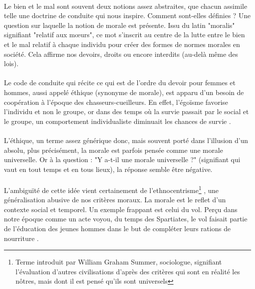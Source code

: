 \documentclass[10pt, french, a4paper]{article}
\begin{document}
\paragraph{}
Le bien et le mal sont souvent deux notions assez abstraites, que chacun assimile telle une doctrine de conduite qui nous inspire. Comment sont-elles définies ? Une question sur laquelle la notion de morale est présente. Issu du latin "moralis" signifiant "relatif aux mœurs", ce mot s’inscrit au centre de la lutte entre le bien et le mal relatif à chaque individu pour créer des formes de normes morales en société. Cela affirme nos devoirs, droits ou encore interdits (au-delà même des lois).

\paragraph{}
Le code de conduite qui récite ce qui est de l’ordre du devoir pour femmes et hommes, aussi appelé éthique (synonyme de morale), est apparu d’un besoin de coopération à l’époque des chasseurs-cueilleurs. En effet, l’égoïsme favorise l’individu et non le groupe, or dans des temps où la survie passait par le social et le groupe, un comportement individualiste diminuait les chances de survie \citep{harari_sapiens:_2015}.

\paragraph{}
L'éthique, un terme assez générique donc, mais souvent porté dans l’illusion d’un absolu, plus précisément, la morale est parfois pensée comme une morale universelle. Or à la question : "Y a-t-il une morale universelle ?" (signifiant qui vaut en tout temps et en tous lieux), la réponse semble être négative.

\paragraph{}
L’ambiguïté de cette idée vient certainement de l’ethnocentrisme\footnote{Terme introduit par William Graham Summer, sociologue, signifiant l’évaluation d’autres civilisations d’après des critères qui sont en réalité les nôtres, mais dont il est pensé qu’ils sont universels} \citep{sumner_folkways_1906}, une généralisation abusive de nos critères moraux. La morale est le reflet d’un contexte social et temporel. Un exemple frappant est celui du vol. Perçu dans notre époque comme un acte voyou, du temps des Spartiates, le vol faisait partie de l’éducation des jeunes hommes dans le but de compléter leurs rations de nourriture \citep{ducat_du_2017}.
\end{document}
